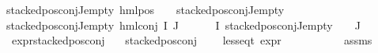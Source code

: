\begin{isabellebody}
{\isachardoublequoteopen}stacked{\isacharunderscore}{\kern0pt}pos{\isacharunderscore}{\kern0pt}conj{\isacharunderscore}{\kern0pt}J{\isacharunderscore}{\kern0pt}empty\ {\isacharparenleft}{\kern0pt}hml{\isacharunderscore}{\kern0pt}pos\ {\isacharunderscore}{\kern0pt}\ {\isasympsi}{\isacharparenright}{\kern0pt}{\isachardoublequoteclose}\ \ {\isachardoublequoteopen}stacked{\isacharunderscore}{\kern0pt}pos{\isacharunderscore}{\kern0pt}conj{\isacharunderscore}{\kern0pt}J{\isacharunderscore}{\kern0pt}empty\ {\isasympsi}{\isachardoublequoteclose}\ {\isacharbar}{\kern0pt}\isanewline
{\isachardoublequoteopen}stacked{\isacharunderscore}{\kern0pt}pos{\isacharunderscore}{\kern0pt}conj{\isacharunderscore}{\kern0pt}J{\isacharunderscore}{\kern0pt}empty\ {\isacharparenleft}{\kern0pt}hml{\isacharunderscore}{\kern0pt}conj\ I\ J\ {\isasymPhi}{\isacharparenright}{\kern0pt}{\isachardoublequoteclose}\isanewline
{}\ {\isachardoublequoteopen}{\isasymforall}{\isasymphi}\ {\isasymin}\ {\isacharparenleft}{\kern0pt}{\isasymPhi}\ {\isacharbackquote}{\kern0pt}\ I{\isacharparenright}{\kern0pt}{\isachardot}{\kern0pt}\ {\isacharparenleft}{\kern0pt}stacked{\isacharunderscore}{\kern0pt}pos{\isacharunderscore}{\kern0pt}conj{\isacharunderscore}{\kern0pt}J{\isacharunderscore}{\kern0pt}empty\ {\isasymphi}{\isacharparenright}{\kern0pt}{\isachardoublequoteclose}\ {\isachardoublequoteopen}{\isasymPhi}\ {\isacharbackquote}{\kern0pt}\ J\ {\isacharequal}{\kern0pt}\ {\isacharbraceleft}{\kern0pt}{\isacharbraceright}{\kern0pt}{\isachardoublequoteclose}\isanewline
\isanewline
\isanewline
{}\isamarkupfalse%
\ expr{\isacharunderscore}{\kern0pt}stacked{\isacharunderscore}{\kern0pt}pos{\isacharunderscore}{\kern0pt}conj{\isacharcolon}{\kern0pt}\isanewline
\ \ \ {\isachardoublequoteopen}stacked{\isacharunderscore}{\kern0pt}pos{\isacharunderscore}{\kern0pt}conj\ {\isasymphi}{\isachardoublequoteclose}\isanewline
\ \ \ {\isachardoublequoteopen}less{\isacharunderscore}{\kern0pt}eq{\isacharunderscore}{\kern0pt}t\ {\isacharparenleft}{\kern0pt}expr\ {\isasymphi}{\isacharparenright}{\kern0pt}\ {\isacharparenleft}{\kern0pt}{}{\isacharcomma}{\kern0pt}\ {\isasyminfinity}{\isacharcomma}{\kern0pt}\ {}{\isacharcomma}{\kern0pt}\ {}{\isacharcomma}{\kern0pt}\ {}{\isacharcomma}{\kern0pt}\ {}{\isacharparenright}{\kern0pt}{\isachardoublequoteclose}\isanewline
%
\isadelimproof
\ \ %
\endisadelimproof
%
\isatagproof
{}\isamarkupfalse%
\ assms\isanewline
{}\isamarkupfalse%

\end{isabellebody}
